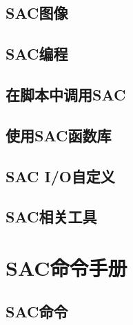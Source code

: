 \documentclass[a4paper, 11pt, twoside]{book}
\begin{document}
\chapter{SAC图像}
\label{chap:sac-graphics}







\chapter{SAC编程}
\label{chap:sac-programming}






\chapter{在脚本中调用SAC}
\label{chap:sac-script}



\chapter{使用SAC函数库}
\label{chap:sac-libs}





\chapter{SAC I/O自定义}
\label{chap:sac-custom-io}


\chapter{SAC相关工具}






\part{SAC命令手册}
\chapter{SAC命令}

\end{document}
